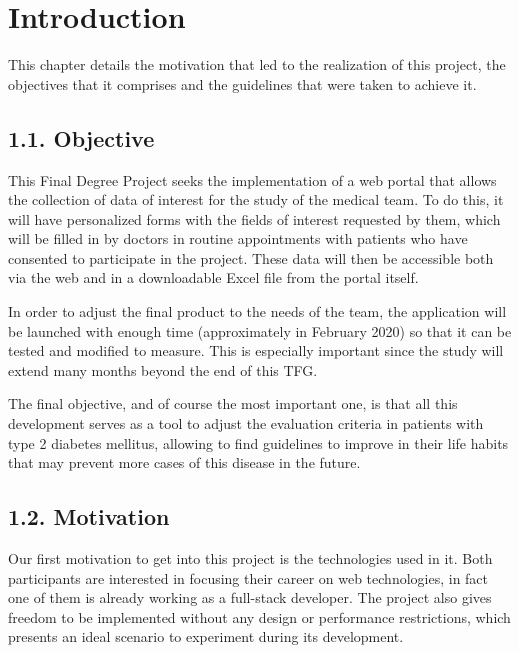 \chapter*{Introduction}
This chapter details the motivation that led to the realization of this project, the objectives that it comprises and the guidelines that were taken to achieve it.


    \section*{1.1. Objective}
    
    This Final Degree Project seeks the implementation of a web portal that allows the collection of data of interest for the study of the medical team. To do this, it will have personalized forms with the fields of interest requested by them, which will be filled in by doctors in routine appointments with patients who have consented to participate in the project. These data will then be accessible both via the web and in a downloadable Excel file from the portal itself.\newline
	
    In order to adjust the final product to the needs of the team, the application will be launched with 
    enough time (approximately in February 2020) so that it can be tested and modified to measure. This is especially important since the study will extend many months beyond the end of this TFG.\newline
	
	The final objective, and of course the most important one, is that all this development serves as a tool to adjust the evaluation criteria in patients with type 2 diabetes mellitus, allowing to find guidelines to improve in their life habits that may prevent more cases of this disease in the future.\newpage
	
	\section*{1.2. Motivation}
    
    Our first motivation to get into this project is the technologies used in it. Both participants are interested in focusing their career on web technologies, in fact one of them is already working as a full-stack developer. The project also gives freedom to be implemented without any design or performance restrictions, which presents an ideal scenario to experiment during its development.\newline
	
